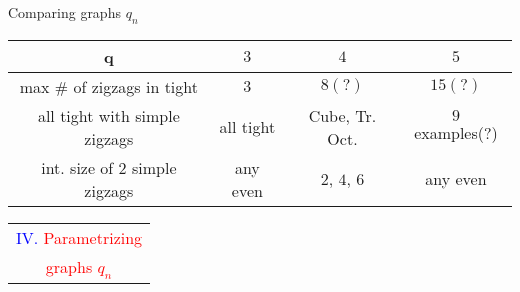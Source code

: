 \documentclass[%
pdf,
colorBG,
slideColor,
]{prosper}
\begin{document}
\begin{slide}{Comparing graphs $q_n$}

\vspace{-4mm}
\begin{center}
{\scriptsize 
\begin{tabular}{|c||c|c|c|}
\hline
q                            &$3$        &$4$                &$5$\\
\hline
\hline
max \# of zigzags in tight   &$3$       &$8(?)$               &$15(?)$\\
\hline
all tight with simple zigzags   &all tight  &Cube, Tr. Oct.     &$9$ examples(?)\\
\hline
int. size of $2$ simple zigzags &any even   &$2$, $4$, $6$      &any even\\
\hline
\end{tabular}
}
\begin{center}
\end{center}

\end{center}


\end{slide}














\begin{slide}{}
\begin{center}
{\Huge 
\begin{tabular*}{6cm}{c}
\\[0.5cm]
\textcolor{blue}{IV. }\textcolor{red}{Parametrizing}\\
\textcolor{red}{graphs $q_n$}
\end{tabular*}
}
\end{center}
\end{slide}
\end{document}
